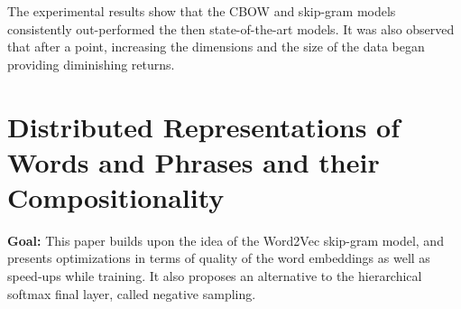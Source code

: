\documentclass[11pt,a4paper]{article}
\begin{document}
  The experimental results show that the CBOW and skip-gram models consistently out-performed the then state-of-the-art models. It was also observed that after a point, increasing the dimensions and the size of the data began providing diminishing returns.



\section{Distributed Representations of Words and Phrases and their Compositionality} %
\label{sec:distributed_representations_of_words_and_phrases_and_their_compositionality}

  \textbf{Goal:}
  This paper builds upon the idea of the Word2Vec skip-gram model, and presents optimizations in terms of quality of the word embeddings as well as speed-ups while training. It also proposes an alternative to the hierarchical softmax final layer, called negative sampling.\\
\end{document}
